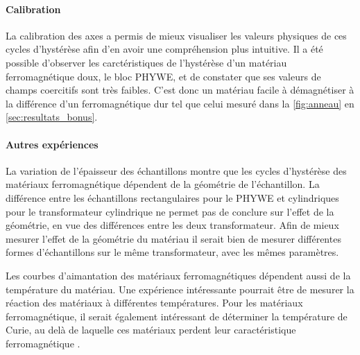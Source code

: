 \paragraph*{Calibration}
La calibration des axes a permis de mieux visualiser les valeurs physiques de ces cycles d'hystérèse afin d'en avoir une compréhension plus intuitive. Il a été possible d'observer les carctéristiques de l'hystérèse d'un matériau ferromagnétique doux, le bloc PHYWE, et de constater que ses valeurs de champs coercitifs sont très faibles. C'est donc un matériau facile à démagnétiser à la différence d'un ferromagnétique dur tel que celui mesuré dans la \autoref{fig:anneau} en \autoref{sec:resultats_bonus}.

\paragraph*{Autres expériences}
La variation de l'épaisseur des échantillons montre que les cycles d'hystérèse des matériaux ferromagnétique dépendent de la géométrie de l'échantillon. La différence entre les échantillons rectangulaires pour le PHYWE et cylindriques pour le transformateur cylindrique ne permet pas de conclure sur l'effet de la géométrie, en vue des différences entre les deux transformateur. Afin de mieux mesurer l'effet de la géométrie du matériau il serait bien de mesurer différentes formes d'échantillons sur le même transformateur, avec les mêmes paramètres.

Les courbes d'aimantation des matériaux ferromagnétiques dépendent aussi de la température du matériau. Une expérience intéressante pourrait être de mesurer la réaction des matériaux à différentes températures. Pour les matériaux ferromagnétique, il serait également intéressant de déterminer la température de Curie, au delà de laquelle ces matériaux perdent leur caractéristique ferromagnétique \cite{notice}.

